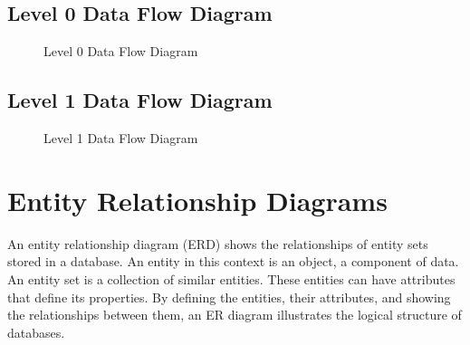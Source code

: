 \documentclass[oneside,a4paper,12pt]{report}
\begin{document}
\subsection{Level 0 Data Flow Diagram}
\begin{center}
	\begin{figure}[!htbp]
		\centering
   	    \caption{Level 0 Data Flow Diagram}
	    \label{fig:Level 0 Data Flow Diagram}
	\end{figure}
\end{center}


\newpage
\subsection{Level 1 Data Flow Diagram}
 \begin{center}
	\begin{figure}[!htbp]
		\centering
	    \caption{Level 1 Data Flow Diagram}
	    \label{fig:Level 1 Data Flow Diagram}
	\end{figure}
\end{center}

\newpage
\section{Entity Relationship Diagrams}
\hspace*{0.5cm} An entity relationship diagram (ERD) shows the relationships of entity sets stored in a database. An entity in this context is an object, a component of data. An entity set is a collection of similar entities. These entities can have attributes that define its properties. By defining the entities, their attributes, and showing the relationships between them, an ER diagram illustrates the logical structure of databases.
\end{document}
